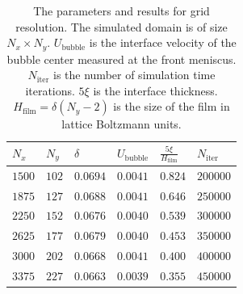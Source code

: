 \documentclass{CFD2011}
\begin{document}
\begin{table}
\begin{tabularx}{0.5\textwidth}{|X|X|X|X|X|X|}
\hline
$N_x$&$N_y$&$\delta$&$U_\mathrm{bubble}$&$\frac{5\xi}{H_{\mathrm{film}}}$&$N_\mathrm{iter}$\\
\hline
$1500$&$102$&$0.0694$&$0.0041$&$0.824$&$200000$\\
\hline
$1875$&$127$&$0.0688$&$0.0041$&$0.646$&$250000$\\
\hline
$2250$&$152$&$0.0676$&$0.0040$&$0.539$&$300000$\\
\hline
$2625$&$177$&$0.0679$&$0.0040$&$0.453$&$350000$\\
\hline
$3000$&$202$&$0.0668$&$0.0041$&$0.400$&$400000$\\
\hline
$3375$&$227$&$0.0663$&$0.0039$&$0.355$&$450000$\\
\hline
\end{tabularx}
\caption{The parameters and results for grid resolution. The simulated domain is
of size $N_x \times N_y$. $U_\mathrm{bubble}$ is the interface velocity of the bubble center
measured at the front meniscus. $N_{\mathrm{iter}}$ is the number of simulation time iterations. 
$5\xi$ is the interface thickness. $H_{\mathrm{film}}=\delta
(N_y-2)$ is the size of the film in
lattice Boltzmann units.
\label{table:parameters:grid:refinement}}
\end{table}
\end{document}
